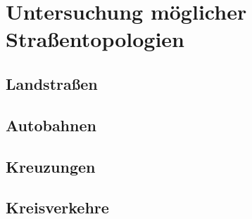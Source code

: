 
\chapter{Untersuchung möglicher Straßentopologien}
\label{cha:street_topologies}

\section{Landstraßen}
\section{Autobahnen}
\section{Kreuzungen}
\section{Kreisverkehre} 